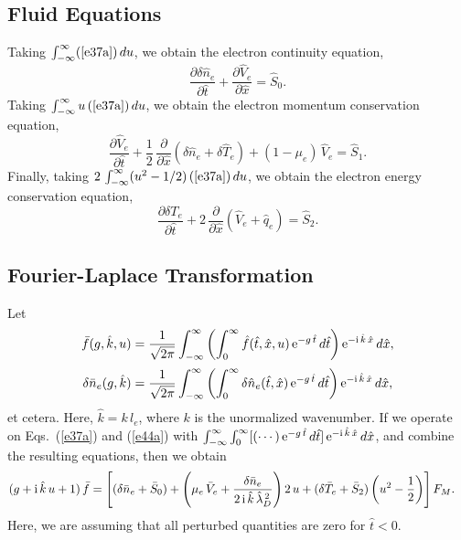 \documentclass[12pt,prb,aps]{revtex4-1}
\begin{document}
\subsection{Fluid Equations}
Taking $\int_{-\infty}^\infty (\ref{e37a})\,du$, we obtain the electron continuity equation,
\begin{equation}\label{econt}
\frac{\partial\delta\hat{n}_e}{\partial\hat{t}}+\frac{\partial\hat{V}_e}{\partial\hat{x}} = \hat{S}_0.
\end{equation}
Taking $\int_{-\infty}^\infty u\,(\ref{e37a})\,du$, we obtain the electron momentum conservation equation, 
\begin{equation}\label{eforce}
\frac{\partial\hat{V}_e}{\partial\hat{t}}+\frac{1}{2}\,\frac{\partial}{\partial\hat{x}}(\delta\hat{n}_e+\delta\hat{T}_e) + (1-\mu_e)\,\hat{V}_e = \hat{S}_1.
\end{equation}
Finally, taking $2\,\int_{-\infty}^\infty (u^2-1/2)\,(\ref{e37a})\,du$, we obtain
 the electron  energy conservation equation,
\begin{equation}\label{eenergy}
\frac{\partial\delta T_e}{\partial\hat{t}} +2\,\frac{\partial}{\partial\hat{x}}(\hat{V}_e+\hat{q}_e)= \hat{S}_2.
\end{equation}

\subsection{Fourier-Laplace Transformation}
Let
\begin{align}
\bar{f}(g,\hat{k},u) &= \frac{1}{\sqrt{2\pi}}\int_{-\infty}^\infty\left(\int_0^\infty \hat{f}(\hat{t},\hat{x},u)\,{\rm e}^{-g\,\hat{t}}\,d\hat{t}\right){\rm e}^{-{\rm i}\,\hat{k}\,\hat{x}}\,d\hat{x},\\[0.5ex]
\delta\bar{n}_e(g,\hat{k}) &=\frac{1}{\sqrt{2\pi}} \int_{-\infty}^\infty\left(\int_0^\infty \delta \hat{n}_e(\hat{t},\hat{x})\,{\rm e}^{-g\,\hat{t}}\,d\hat{t}\right){\rm e}^{-{\rm i}\,\hat{k}\,\hat{x}}\,d\hat{x},
\label{e41x}
\end{align}
et cetera.
Here,
$\hat{k}= k\,l_e$,
where $k$ is the unormalized wavenumber.
If we operate on Eqs.~(\ref{e37a}) and (\ref{e44a}) with $\int_{-\infty}^\infty\int_0^\infty[(\cdots)\,{\rm e}^{-g\,\hat{t}}\,d\hat{t}]\,{\rm e}^{-{\rm i}\,\hat{k}\,\hat{x}}\,d\hat{x}$, 
and combine the
resulting equations, then we obtain
\begin{align}\label{e55x}
(g+{\rm i}\,\hat{k}\,u+1)\,\bar{f}&= \left[(\delta\bar{n}_e+\bar{S}_0)+\left(\mu_e\,\bar{V}_e+\frac{\delta\bar{n}_e}{2\,{\rm i}\,\hat{k}\,\hat{\lambda}_D^{\,2}}\right)2\,u+(\delta\bar{T}_e+\bar{S}_2)\left(u^2-\frac{1}{2}\right)\right] F_M.
\end{align}
Here, we are assuming that all perturbed quantities are zero for $\hat{t}<0$. 
\end{document}
